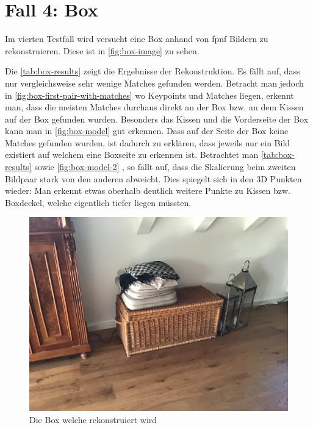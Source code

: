 \section{Fall 4: Box}
\label{sec:testcase-box}
Im vierten Testfall wird versucht eine Box anhand von fpnf Bildern zu rekonstruieren.
Diese ist in \autoref{fig:box-image} zu sehen.

Die \autoref{tab:box-results} zeigt die Ergebnisse der Rekonstruktion.
Es fällt auf, dass nur vergleichsweise sehr wenige Matches gefunden werden.
Betracht man jedoch in \autoref{fig:box-first-pair-with-matches} wo Keypoints und Matches liegen, erkennt man, dass die meisten Matches durchaus direkt an der Box bzw. an dem Kissen auf der Box gefunden wurden.
Besonders das Kissen und die Vorderseite der Box kann man in \autoref{fig:box-model} gut erkennen.
Dass auf der Seite der Box keine Matches gefunden wurden, ist dadurch zu erklären, dass jeweils nur ein Bild existiert auf welchem eine Boxseite zu erkennen ist.
Betrachtet man \autoref{tab:box-results} sowie \autoref{fig:box-model-2} , so fällt auf, dass die Skalierung beim zweiten Bildpaar stark von den anderen abweicht.
Dies spiegelt sich in den 3D Punkten wieder:
Man erkennt etwas oberhalb deutlich weitere Punkte zu Kissen bzw. Boxdeckel, welche eigentlich tiefer liegen müssten.

\begin{figure}
    \includegraphics[width=\textwidth]{src/img/box.jpg}
    \caption{Die Box welche rekonstruiert wird}
    \label{fig:box-image}
\end{figure}

